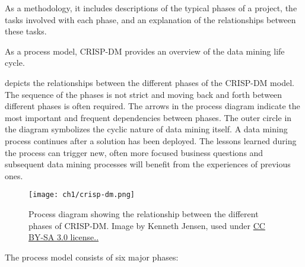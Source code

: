 As a methodology, it includes descriptions of the typical phases of a project, the tasks involved with each phase, and an explanation of the relationships between these tasks.

As a process model, CRISP-DM provides an overview of the data mining life cycle.

 depicts the relationships between the different phases of the CRISP-DM model. The sequence of the phases is not strict and moving back and forth between different phases is often required. The arrows in the process diagram indicate the most important and frequent dependencies between phases. The outer circle in the diagram symbolizes the cyclic nature of data mining itself. A data mining process continues after a solution has been deployed. The lessons learned during the process can trigger new, often more focused business questions and subsequent data mining processes will benefit from the experiences of previous ones.

\begin{figure}[hpt]
    \centering
    \texttt{[image: ch1/crisp-dm.png]}
    \caption{Process diagram showing the relationship between the different phases of CRISP-DM. Image by Kenneth Jensen, used under \href{https://creativecommons.org/licenses/by/2.0/}{CC BY-SA 3.0 license..}}
    \label{fig:crisp-dm}
\end{figure}

The process model consists of six major phases:

